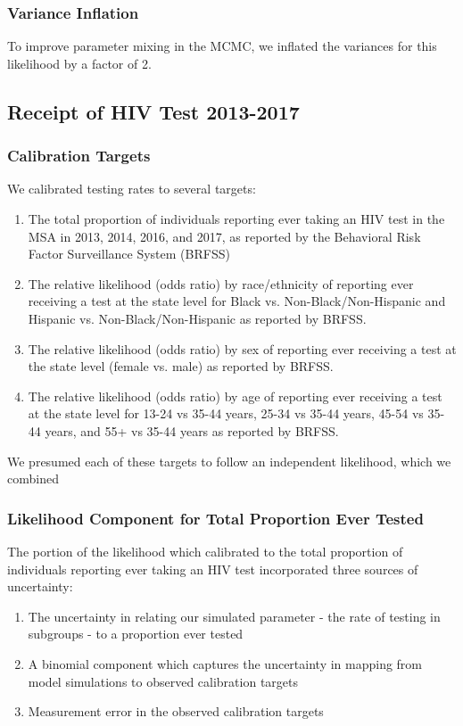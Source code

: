 \documentclass{article}
\begin{document}
\subsubsection{Variance Inflation}
To improve parameter mixing in the MCMC, we inflated the variances for this likelihood by a factor of 2.

\subsection{Receipt of HIV Test 2013-2017}\label{likelihood_testing}

\subsubsection{Calibration Targets}
We calibrated testing rates to several targets:
\begin{enumerate}
	\item The total proportion of individuals reporting ever taking an HIV test in the MSA in 2013, 2014, 2016, and 2017, as reported by the Behavioral Risk Factor Surveillance System (BRFSS)\cite{brfss.13.17}
	\item The relative likelihood (odds ratio) by race/ethnicity of reporting ever receiving a test at the state level for Black vs. Non-Black/Non-Hispanic and Hispanic vs. Non-Black/Non-Hispanic as reported by BRFSS.
	\item The relative likelihood (odds ratio) by sex of reporting ever receiving a test at the state level (female vs. male) as reported by BRFSS.
	\item The relative likelihood (odds ratio) by age of reporting ever receiving a test at the state level for 13-24 vs 35-44 years, 25-34 vs 35-44 years, 45-54 vs 35-44 years, and 55+ vs 35-44 years as reported by BRFSS.
\end{enumerate}

We presumed each of these targets to follow an independent likelihood, which we combined

\subsubsection{Likelihood Component for Total Proportion Ever Tested}
The portion of the likelihood which calibrated to the total proportion of individuals reporting ever taking an HIV test incorporated three sources of uncertainty:

\begin{enumerate}
	\item The uncertainty in relating our simulated parameter - the rate of testing in subgroups - to a proportion ever tested
	\item A binomial component which captures the uncertainty in mapping from model simulations to observed calibration targets
	\item Measurement error in the observed calibration targets
\end{enumerate}  
\end{document}
